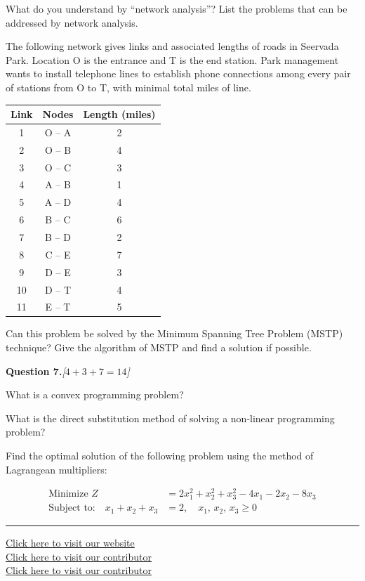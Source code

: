 \documentclass[11pt,a4paper]{article}
\newcommand{\pts}[1]{\hfill   \textit{[#1]}}
\begin{document}
\begin{parts}
  \item What do you understand by ``network analysis''? List the problems that can be addressed by network analysis.
  \item The following network gives links and associated lengths of roads in Seervada Park. Location O is the entrance and T is the end station. Park management wants to install telephone lines to establish phone connections among every pair of stations from O to T, with minimal total miles of line.
  
\begin{center}
  
\begin{tabular}{|c|c|c|}
  \hline
   \textbf{Link} &   \textbf{Nodes} &   \textbf{Length (miles)} \\
  \hline
  1 & O -- A & 2 \\
  2 & O -- B & 4 \\
  3 & O -- C & 3 \\
  4 & A -- B & 1 \\
  5 & A -- D & 4 \\
  6 & B -- C & 6 \\
  7 & B -- D & 2 \\
  8 & C -- E & 7 \\
  9 & D -- E & 3 \\
  10 & D -- T & 4 \\
  11 & E -- T & 5 \\
  \hline
  \end{tabular}
  \end{center}
  Can this problem be solved by the Minimum Spanning Tree Problem (MSTP) technique? Give the algorithm of MSTP and find a solution if possible.
\end{parts}

\bigskip




\noindent   \textbf{Question 7.}\pts{$4+3+7=14$}

\begin{parts}
  \item What is a convex programming problem?
  \item What is the direct substitution method of solving a non-linear programming problem?
  \item Find the optimal solution of the following problem using the method of Lagrangean multipliers:
  
\begin{align*}
     \text{Minimize } Z &= 2x_1^2 + x_2^2 + x_3^2 - 4x_1 - 2x_2 - 8x_3 \\
     \text{Subject to:}\quad x_1 + x_2 + x_3 &= 2, \quad x_1,\, x_2,\, x_3 \geq 0
  \end{align*}
\end{parts}

\vfill
\rule{\linewidth}{0.4pt}

\begin{center}\small
\href{https://bhu-exam.vercel.app/}{Click here to visit our website}\\[4pt]\href{https://me-aryan.vercel.app/}{Click here to visit our contributor}\\[4pt]\href{https://quashan-me.vercel.app/}{Click here to visit our contributor}
\end{center}
\end{document}
